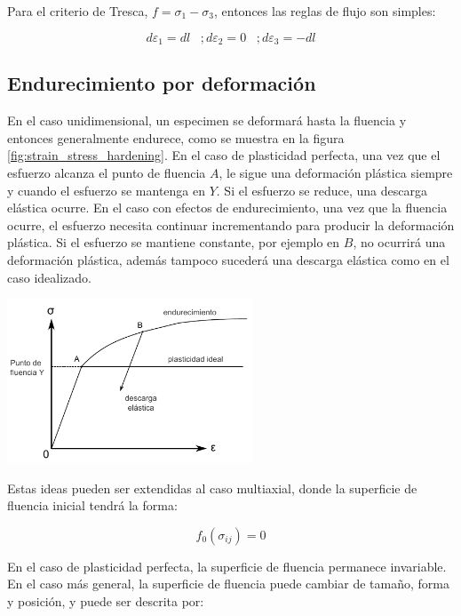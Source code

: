 Para el criterio de Tresca, $f = \sigma_1 - \sigma_3$, entonces las reglas de flujo son simples:
~\cite{hosford2007}

$$
d\varepsilon_1 = dl \,\,\,\,\, ;
d\varepsilon_2 = 0  \,\,\,\,\, ;
d\varepsilon_3 = -dl
$$


\subsection{Endurecimiento por deformación}

En el caso unidimensional, un especimen se deformará hasta la fluencia y entonces generalmente 
endurece, como se muestra en la figura \ref{fig:strain_stress_hardening}. En el caso de 
plasticidad perfecta, una vez que el esfuerzo alcanza el punto de fluencia $A$, le sigue una 
deformación plástica siempre y cuando el esfuerzo se mantenga en $Y$. Si el esfuerzo se reduce, 
una descarga elástica ocurre. En el caso con efectos de endurecimiento, una vez que la fluencia 
ocurre, el esfuerzo necesita continuar incrementando para producir la deformación plástica. 
Si el esfuerzo se mantiene constante, por ejemplo en $B$, no ocurrirá una deformación plástica, 
además tampoco sucederá una descarga elástica como en el caso idealizado. ~\cite{kelly2012}

\begin{center}
\includegraphics[width=0.55\textwidth]{src/ch2/strain_stress_hardening}
\label{fig:strain_stress_hardening}
\end{center}

Estas ideas pueden ser extendidas al caso multiaxial, donde la superficie de fluencia inicial 
tendrá la forma:

\begin{equation}
f_0 (\sigma_{ij}) = 0
\end{equation}

En el caso de plasticidad perfecta, la superficie de fluencia permanece invariable. En el caso 
más general, la superficie de fluencia puede cambiar de tamaño, forma y posición, y puede ser 
descrita por:

